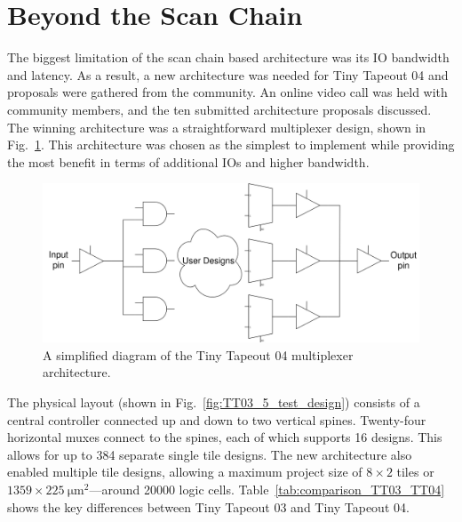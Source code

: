 \section{Beyond the Scan Chain}
\label{sec:beyond_scanchain}
The biggest limitation of the scan chain based architecture was its IO bandwidth and latency.
As a result, a new architecture was needed for Tiny Tapeout 04 and proposals were gathered from the community.
An online video call was held with community members, and the ten submitted architecture proposals discussed.
The winning architecture was a straightforward multiplexer design, shown in Fig.~\ref{fig:multiplexer_design}. This architecture was chosen as the simplest to implement while providing the most benefit in terms of additional IOs and higher bandwidth.

\begin{figure}[!t]
\centering
\includegraphics[width=\columnwidth]{./Figs/mux architecture.png}
\caption{A simplified diagram of the Tiny Tapeout 04 multiplexer architecture.}
\label{fig:multiplexer_design}
\end{figure}

The physical layout (shown in Fig.~\ref{fig:TT03_5_test_design}) consists of a central controller connected up and down to two vertical spines.
Twenty-four horizontal muxes connect to the spines, each of which supports 16 designs.
This allows for up to 384 separate single tile designs.
The new architecture also enabled multiple tile designs, allowing a maximum project size of $8 \times 2$ tiles or $1359 \times \qty{225}{\um\squared}$---around \num{20000} logic cells. Table~\ref{tab:comparison_TT03_TT04} shows the key differences between Tiny Tapeout 03 and Tiny Tapeout 04.

